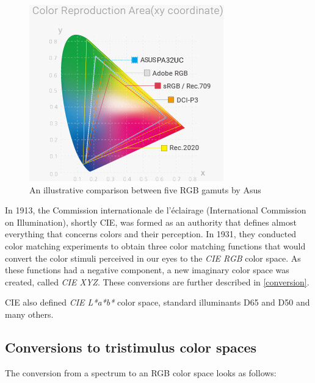 \begin{figure}[h]
	\centering
	\includegraphics[width=0.6\linewidth]{img/gamut.jpg}
	\caption[ASUS RGB]{An illustrative comparison between five RGB gamuts by Asus \footnotemark}
	\label{fig:gamut}
\end{figure}

In 1913, the Commission internationale de l'éclairage (International Commission on Illumination), shortly CIE, was formed as an authority that defines almost everything that concerns colors and their perception. In 1931, they conducted color matching experiments to obtain three color matching functions that would convert the color stimuli perceived in our eyes to the \emph{CIE RGB} color space. As these functions had a negative component, a new imaginary color space was created, called \emph{CIE XYZ}. These conversions are further described in \autoref{conversion}.

CIE also defined \emph{CIE L*a*b*} color space, standard illuminants D65 and D50 and many others.

\subsection{Conversions to tristimulus color spaces}
\label{conversion}

The conversion from a spectrum to an RGB color space looks as follows:

